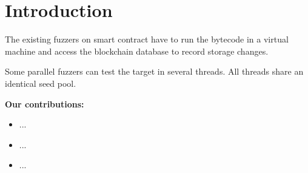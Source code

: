\section{Introduction}

The existing fuzzers on smart contract have to run the bytecode in a virtual machine and access the blockchain database to record storage changes. 

Some parallel fuzzers can test the target in several threads. All threads share an identical seed pool\cite{afl, aflfast, enfuzz, }. 


\noindent\textbf{Our contributions:}
\begin{itemize}
    \item ...
    \item ...
    \item ...
\end{itemize}